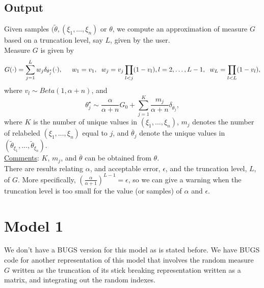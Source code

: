 \documentclass[12pt]{article}
\begin{document}
\subsection{Output}
Given samples  $(\tilde{\theta}, (\xi_1, \ldots, \xi_n)$  or $\theta$,  we compute an approximation of measure $G$ based on a truncation level, say $L$, given by the user. \\
Measure $G$ is given by 
$$G(\cdot)=\sum_{j=1}^Lw_j\delta_{\theta^{\star}_j}(\cdot), \hspace{0.5cm} w_1=v_1, \hspace{0.2cm}w_j=v_j\prod_{l<j}(1-v_l), l=2, \ldots, L-1, \hspace{0.2cm}w_L=\prod_{l<L}(1-v_l),$$
where $v_l\sim Beta(1, \alpha+n)$, and $$\theta^{\star}_j\sim \frac{\alpha}{\alpha+n}G_0 + \sum_{j=1}^K\frac{m_j}{\alpha+n}\delta_{\overline{\theta}_j},$$
where $K$ is the number of unique values in $(\xi_1 ,\ldots, \xi_n)$, $m_j$ denotes the number of relabeled $(\xi_1 ,\ldots, \xi_n)$ equal to $j$, and $\overline{\theta}_j$ denote the  unique values in $(\tilde{\theta}_{\xi_1}, \ldots, \tilde{\theta}_{\xi_n})$.\\

\underline{Comments}: $K$, $m_j$, and $\overline{\theta}$ can be obtained from $\theta$.\\
There are results relating $\alpha$, and acceptable error, $\epsilon$, and  the truncation level, $L$, of $G$. More specifically,  $\left(\frac{\alpha}{\alpha+1}\right)^{L-1}=\epsilon$, so we can give a warning when the truncation level is too small for the value (or samples) of $\alpha$ and $\epsilon$.


\section{Model 1}
We don't have a BUGS version for this model as is stated before. We have  BUGS code for another representation of this model that involves the random measure $G$ written as the truncation of its stick breaking representation  written as a matrix,  and integrating out the random indexes. 
\end{document}
